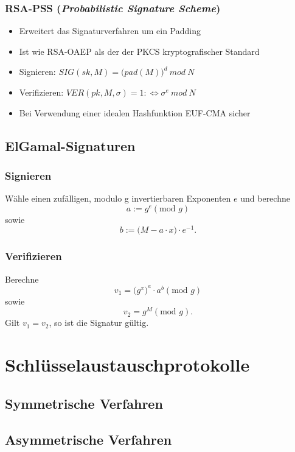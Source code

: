 \subsubsection{RSA-PSS (\textit{Probabilistic Signature Scheme})}
\begin{itemize}
	\item Erweitert das Signaturverfahren um ein Padding
	\item Ist wie RSA-OAEP als der der PKCS kryptografischer Standard
	\item Signieren: \(SIG(sk,M) = \big(pad(M)\big)^d~mod~N\)
	\item Verifizieren: \(VER(pk,M,\sigma)=1 :\Leftrightarrow \sigma^e~mod~N\)
	\item Bei Verwendung einer idealen Hashfunktion EUF-CMA sicher
\end{itemize}


\subsection{ElGamal-Signaturen}

\subsubsection{Signieren}
Wähle einen zufälligen, modulo g invertierbaren Exponenten \(e\) und berechne
\[a := g^e (\text{mod } g)\]
sowie
\[b := \big(M - a \cdot x \big) \cdot e^{-1}.\]

\subsubsection{Verifizieren}
Berechne
\[v_1 = \big(g^x\big)^a \cdot a^b (\text{mod } g)\]
sowie
\[v_2 = g^M (\text{mod } g).\]
Gilt \(v_1=v_2\), so ist die Signatur gültig.



\section{Schlüsselaustauschprotokolle}

\subsection{Symmetrische Verfahren}


\subsection{Asymmetrische Verfahren}

